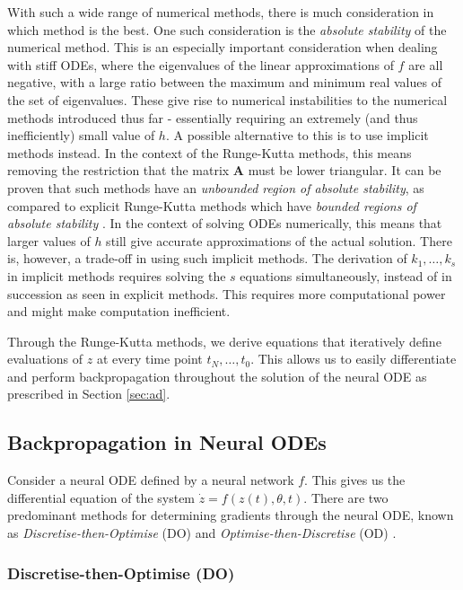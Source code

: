 \documentclass[a4paper,11pt,titlepage]{article}
\theoremstyle{definition}
\theoremstyle{plain}
\theoremstyle{remark}
\begin{document}
With such a wide range of numerical methods, there is much consideration in which method is the best. One such consideration is the \textit{absolute stability} of the numerical method. This is an especially important consideration when dealing with stiff ODEs, where the eigenvalues of the linear approximations of $f$ are all negative, with a large ratio between the maximum and minimum real values of the set of eigenvalues. These give rise to numerical instabilities to the numerical methods introduced thus far - essentially requiring an extremely (and thus inefficiently) small value of $h$. A possible alternative to this is to use implicit methods instead. In the context of the Runge-Kutta methods, this means removing the restriction that the matrix $\mathbf{A}$ must be lower triangular. It can be proven that such methods have an \textit{unbounded region of absolute stability}, as compared to explicit Runge-Kutta methods which have \textit{bounded regions of absolute stability} \cite{sulimayers2003}. In the context of solving ODEs numerically, this means that larger values of $h$ still give accurate approximations of the actual solution. There is, however, a trade-off in using such implicit methods. The derivation of $k_1, \dots, k_s$ in implicit methods requires solving the $s$ equations simultaneously, instead of in succession as seen in explicit methods. This requires more computational power and might make computation inefficient.

Through the Runge-Kutta methods, we derive equations that iteratively define evaluations of $z$ at every time point $t_N, \dots, t_0$. This allows us to easily differentiate and perform backpropagation throughout the solution of the neural ODE as prescribed in Section \ref{sec:ad}.

\subsection{Backpropagation in Neural ODEs}

Consider a neural ODE defined by a neural network $f$. This gives us the differential equation of the system $\dot{z}=f(z(t),\theta,t)$. There are two predominant methods for determining gradients through the neural ODE, known as \textit{Discretise-then-Optimise} (DO) and \textit{Optimise-then-Discretise} (OD) \cite{kidger2022neural}.

\subsubsection{Discretise-then-Optimise (DO)}
\label{sec:do}
\end{document}
